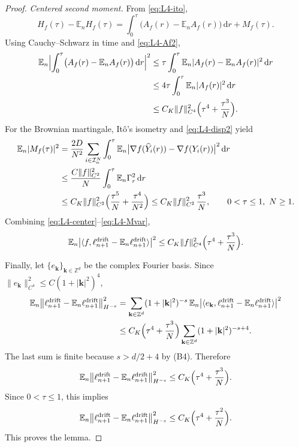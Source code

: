 \documentclass[a4paper,fleqn]{cas-sc}
\theoremstyle{definition}
\theoremstyle{remark}
\begin{document}
\begin{proof}
\medskip
\noindent\emph{Centered second moment.}
From \eqref{eq:L4-ito},
\begin{equation}\label{eq:L4-center}
H_f(\tau)-\mathbb E_nH_f(\tau)
=\int_0^\tau\bigl(A_f(r)-\mathbb E_nA_f(r)\bigr)\,\mathrm dr+M_f(\tau).
\end{equation}
Using Cauchy--Schwarz in time and \eqref{eq:L4-Af2},
\begin{equation}\label{eq:L4-driftvar}
\begin{aligned}
\mathbb E_n\Bigl|\int_0^\tau\bigl(A_f(r)-\mathbb E_nA_f(r)\bigr)\,\mathrm dr\Bigr|^2
&\le\tau\int_0^\tau\mathbb E_n|A_f(r)-\mathbb E_nA_f(r)|^2\,\mathrm dr\\
&\le4\tau\int_0^\tau\mathbb E_n|A_f(r)|^2\,\mathrm dr\\
&\le C_K\|f\|_{C^4}^2\Bigl(\tau^4+\frac{\tau^3}{N}\Bigr).
\end{aligned}
\end{equation}
For the Brownian martingale, It\^o's isometry and \eqref{eq:L4-disp2} yield
\begin{equation}\label{eq:L4-Mvar}
\begin{aligned}
\mathbb E_n|M_f(\tau)|^2
&=\frac{2D}{N^2}\sum_{i\in\mathcal I^N_n}\int_0^\tau\mathbb E_n\bigl|\nabla f(\widehat Y_i(r))-\nabla f(Y_i(r))\bigr|^2\,\mathrm dr\\
&\le\frac{C\|f\|_{C^2}^2}{N}\int_0^\tau\mathbb E_n\Gamma_r^2\,\mathrm dr\\
&\le C_K\|f\|_{C^2}^2\Bigl(\frac{\tau^5}{N}+\frac{\tau^4}{N^2}\Bigr)
\le C_K\|f\|_{C^2}^2\,\frac{\tau^3}{N},\qquad 0<\tau\le1,\ N\ge1 .
\end{aligned}
\end{equation}
Combining \eqref{eq:L4-center}--\eqref{eq:L4-Mvar},
\[
\mathbb E_n\bigl|\langle f,\ell^{\mathrm{drift}}_{n+1}-\mathbb E_n\ell^{\mathrm{drift}}_{n+1}\rangle\bigr|^2
\le C_K\|f\|_{C^4}^2\Bigl(\tau^4+\frac{\tau^3}{N}\Bigr).
\]

Finally, let $\{e_{\mathbf k}\}_{\mathbf k\in\mathbb Z^d}$ be the complex Fourier basis.
Since $\|e_{\mathbf k}\|_{C^4}^2\le C(1+|\mathbf k|^2)^4$,
\[
\begin{aligned}
\mathbb E_n\bigl\|\ell^{\mathrm{drift}}_{n+1}-\mathbb E_n\ell^{\mathrm{drift}}_{n+1}\bigr\|_{H^{-s}}^2
&=\sum_{\mathbf k\in\mathbb Z^d}(1+|\mathbf k|^2)^{-s}\,
\mathbb E_n\bigl|\langle e_{\mathbf k},\ell^{\mathrm{drift}}_{n+1}-\mathbb E_n\ell^{\mathrm{drift}}_{n+1}\rangle\bigr|^2\\
&\le C_K\Bigl(\tau^4+\frac{\tau^3}{N}\Bigr)\sum_{\mathbf k\in\mathbb Z^d}(1+|\mathbf k|^2)^{-s+4}.
\end{aligned}
\]
The last sum is finite because $s>d/2+4$ by (B4). Therefore
\[
\mathbb E_n\bigl\|\ell^{\mathrm{drift}}_{n+1}-\mathbb E_n\ell^{\mathrm{drift}}_{n+1}\bigr\|_{H^{-s}}^2
\le C_K\Bigl(\tau^4+\frac{\tau^3}{N}\Bigr).
\]
Since $0<\tau\le1$, this implies
\[
\mathbb E_n\bigl\|\ell^{\mathrm{drift}}_{n+1}-\mathbb E_n\ell^{\mathrm{drift}}_{n+1}\bigr\|_{H^{-s}}^2
\le C_K\Bigl(\tau^4+\frac{\tau^2}{N}\Bigr).
\]
This proves the lemma.
\end{proof}
\end{document}
